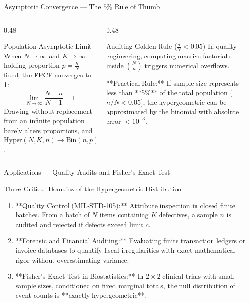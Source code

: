 \documentclass[aspectratio=169,xcolor={dvipsnames,table}]{beamer}
\begin{document}
\begin{frame}{Asymptotic Convergence --- The $5\%$ Rule of Thumb}
	\vspace{-0.15cm}
	\begin{columns}[T]
		\begin{column}{0.48\textwidth}
			\begin{block}{Population Asymptotic Limit}
				\footnotesize
				When $N \to \infty$ and $K \to \infty$ holding proportion $p = \frac{K}{N}$ fixed, the FPCF converges to 1:
				\begin{align*}
					\lim_{N \to \infty} \dfrac{N-n}{N-1} = 1
				\end{align*}
				\vspace{-0.25cm}
				Drawing without replacement from an infinite population barely alters proportions, and $\text{Hyper}(N, K, n) \to \text{Bin}(n, p)$.
			\end{block}
		\end{column}
		\begin{column}{0.48\textwidth}
			\begin{alertblock}{Auditing Golden Rule ($\frac{n}{N} < 0.05$)}
				\footnotesize
				In quality engineering, computing massive factorials inside $\binom{N}{n}$ triggers numerical overflows.
				
				**Practical Rule:** If sample size represents less than **5\%** of the total population ($n/N < 0.05$), the hypergeometric can be approximated by the binomial with absolute error $< 10^{-3}$.
			\end{alertblock}
		\end{column}
	\end{columns}
\end{frame}

\begin{frame}{Applications --- Quality Audits and Fisher's Exact Test}
	\vspace{-0.15cm}
	\begin{block}{Three Critical Domains of the Hypergeometric Distribution}
		\footnotesize
		\begin{enumerate}
			\itemsep=0.08cm
			\item **Quality Control (MIL-STD-105):** Attribute inspection in closed finite batches. From a batch of $N$ items containing $K$ defectives, a sample $n$ is audited and rejected if defects exceed limit $c$.
			\item **Forensic and Financial Auditing:** Evaluating finite transaction ledgers or invoice databases to quantify fiscal irregularities with exact mathematical rigor without overestimating variance.
			\item **Fisher's Exact Test in Biostatistics:** In $2 \times 2$ clinical trials with small sample sizes, conditioned on fixed marginal totals, the null distribution of event counts is **exactly hypergeometric**.
		\end{enumerate}
	\end{block}
\end{frame}
\end{document}

